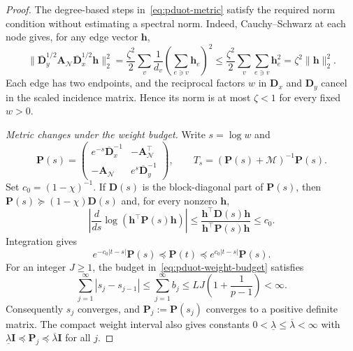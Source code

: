 \begin{proof}
The degree-based steps in~\eqref{eq:pduot-metric} satisfy the required norm condition without estimating a spectral norm.
Indeed, Cauchy--Schwarz at each node gives, for any edge vector $\mathbf{h}$,
\begin{equation*}
\|\overline{\mathbf{D}}_y^{1/2}\mathbf{A}_{\mathcal N}\overline{\mathbf{D}}_x^{1/2}\mathbf{h}\|_2^2
=\frac{\zeta^2}{2}\sum_v\frac{1}{d_v}\left(\sum_{e\ni v}\mathbf{h}_e\right)^2
\leq\frac{\zeta^2}{2}\sum_v\sum_{e\ni v}\mathbf{h}_e^2
=\zeta^2\|\mathbf{h}\|_2^2.
\end{equation*}
Each edge has two endpoints, and the reciprocal factors $w$ in $\mathbf{D}_x$ and $\mathbf{D}_y$ cancel in the scaled incidence matrix.
Hence its norm is at most $\zeta<1$ for every fixed $w>0$.
\par\smallskip\noindent\textit{Metric changes under the weight budget.}
Write $s=\log w$ and
\begin{equation*}
\mathbf P(s)=\begin{pmatrix}e^{-s}\overline{\mathbf D}_x^{-1}&-\mathbf A_{\mathcal N}^{\top}\\-\mathbf A_{\mathcal N}&e^s\overline{\mathbf D}_y^{-1}\end{pmatrix},\qquad T_s=(\mathbf P(s)+\mathcal M)^{-1}\mathbf P(s).
\end{equation*}
Set $c_0=(1-\chi)^{-1}$.
If $\mathbf D(s)$ is the block-diagonal part of $\mathbf P(s)$, then $\mathbf P(s)\succeq(1-\chi)\mathbf D(s)$ and, for every nonzero $\mathbf h$,
\begin{equation*}
\left|\frac{d}{ds}\log(\mathbf h^\top\mathbf P(s)\mathbf h)\right|\leq\frac{\mathbf h^\top\mathbf D(s)\mathbf h}{\mathbf h^\top\mathbf P(s)\mathbf h}\leq c_0.
\end{equation*}
Integration gives
\begin{equation}
\label{eq:pduot-metric-comparison}
e^{-c_0|t-s|}\mathbf P(s)\preceq\mathbf P(t)\preceq e^{c_0|t-s|}\mathbf P(s).
\end{equation}
For an integer $J\geq1$, the budget in~\eqref{eq:pduot-weight-budget} satisfies
\begin{equation*}
\sum_{j=1}^{\infty}|s_j-s_{j-1}|\leq\sum_{j=1}^{\infty}b_j\leq LJ\left(1+\frac{1}{p-1}\right)<\infty.
\end{equation*}
Consequently $s_j$ converges, and $\mathbf P_j:=\mathbf P(s_j)$ converges to a positive definite matrix.
The compact weight interval also gives constants $0<\underline\lambda\leq\overline\lambda<\infty$ with $\underline\lambda\mathbf I\preceq\mathbf P_j\preceq\overline\lambda\mathbf I$ for all $j$.


\end{proof}
